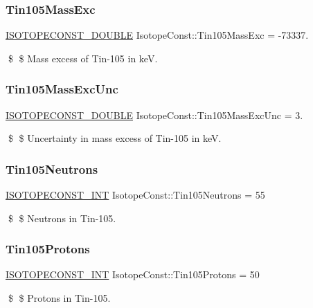 \subsubsection{\texorpdfstring{Tin105\+Mass\+Exc}{Tin105MassExc}}
{\footnotesize\ttfamily \mbox{\hyperlink{group___isotope_const-_macros_ga8f45a7272ce02c0b4c65c44636ed719a}{I\+S\+O\+T\+O\+P\+E\+C\+O\+N\+S\+T\+\_\+\+D\+O\+U\+B\+LE}} Isotope\+Const\+::\+Tin105\+Mass\+Exc = -\/73337.}

\$ \$ Mass excess of Tin-\/105 in keV. \mbox{\label{group___isotope_const-_tin-_sn105_gabe4bc987f4bf76a9f16dbc8d35dcee85}} 
\subsubsection{\texorpdfstring{Tin105\+Mass\+Exc\+Unc}{Tin105MassExcUnc}}
{\footnotesize\ttfamily \mbox{\hyperlink{group___isotope_const-_macros_ga8f45a7272ce02c0b4c65c44636ed719a}{I\+S\+O\+T\+O\+P\+E\+C\+O\+N\+S\+T\+\_\+\+D\+O\+U\+B\+LE}} Isotope\+Const\+::\+Tin105\+Mass\+Exc\+Unc = 3.}

\$ \$ Uncertainty in mass excess of Tin-\/105 in keV. \mbox{\label{group___isotope_const-_tin-_sn105_ga13f760be34891cbbc31855aeeff0ff56}} 
\subsubsection{\texorpdfstring{Tin105\+Neutrons}{Tin105Neutrons}}
{\footnotesize\ttfamily \mbox{\hyperlink{group___isotope_const-_macros_ga5f18360b3e99483a35c32d789e62621c}{I\+S\+O\+T\+O\+P\+E\+C\+O\+N\+S\+T\+\_\+\+I\+NT}} Isotope\+Const\+::\+Tin105\+Neutrons = 55}

\$ \$ Neutrons in Tin-\/105. \mbox{\label{group___isotope_const-_tin-_sn105_gabdbac415982d76daafea71b2a85314fc}} 
\subsubsection{\texorpdfstring{Tin105\+Protons}{Tin105Protons}}
{\footnotesize\ttfamily \mbox{\hyperlink{group___isotope_const-_macros_ga5f18360b3e99483a35c32d789e62621c}{I\+S\+O\+T\+O\+P\+E\+C\+O\+N\+S\+T\+\_\+\+I\+NT}} Isotope\+Const\+::\+Tin105\+Protons = 50}

\$ \$ Protons in Tin-\/105. 